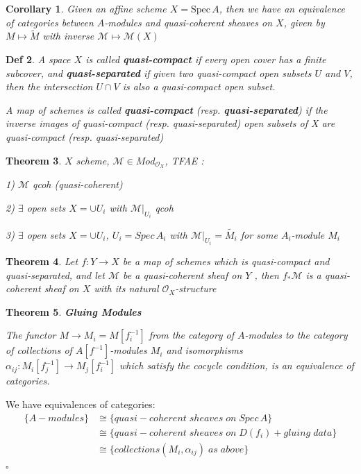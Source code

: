 \documentclass{article}
\newtheorem{theorem}{Theorem}[section]
\newtheorem{definition}[theorem]{Def}
\newtheorem{corollary}[theorem]{Corollary}
\newenvironment{Proof}{{\noindent \indent \it Proof:\quad}}{\hfill $\square$\par}
\begin{document}
\begin{corollary}
    Given an affine scheme $X =\mathrm{Spec}\, A$, then we have an equivalence of categories between $A$-modules and quasi-coherent sheaves on $X$, given by $M \mapsto \widetilde M$ with inverse $\mathcal M \mapsto \mathcal M(X)$
\end{corollary}

\begin{definition}
    A space $X$ is called \textbf{quasi-compact} if every open cover has a finite subcover, and
\textbf{quasi-separated} if given two quasi-compact open subsets $U$ and $V$, then the intersection $U \cap V$ is also
a quasi-compact open subset.

A map of schemes is called \textbf{quasi-compact} (resp. \textbf{quasi-separated}) if the
inverse images of quasi-compact (resp. quasi-separated) open subsets of X are quasi-compact (resp.
quasi-separated)
\end{definition}
\begin{theorem}
    $X$ scheme, $\mathcal M\in Mod_{\mathcal O_X}$, TFAE :
    
    1) $\mathcal M$ qcoh (quasi-coherent)

    2) $\exists$ open sets $X=\cup U_i$ with $\mathcal M|_{U_i}$ qcoh

    3) $\exists$ open sets $X=\cup U_i$, $U_i=Spec\, A_i$ with $\mathcal M|_{U_i}=\widetilde {M_i}$ for some $A_i$-module $M_i$
\label{Thm 3.58}
\end{theorem}

\begin{theorem}
    Let $f : Y \to X$ be a map of schemes which is quasi-compact and quasi-separated, and let $\mathcal M$ be a quasi-coherent sheaf on $Y$ , then $f_\ast\mathcal M$ is a quasi-coherent sheaf on $X$ with its natural $\mathcal O_X$-structure
    \label{Thm 3.59}
\end{theorem}

\begin{theorem}
    \textbf{Gluing Modules}

The functor $M \to M_i = M[f_i^{-1}]$ from the category of $A$-modules to the category of collections of $A[f^{-1}]$-modules $M_i$ and isomorphisms $\alpha_{ij} : M_i
[f_j^{-1}] \to M_j [f_i^{-1}]$ which
satisfy the cocycle condition, is an equivalence of categories.
\end{theorem}
\begin{Proof}
We have equivalences of categories:
\begin{align*}
\label{sup}
\{A-modules\}&\cong
\{quasi-coherent\; sheaves\; on\; Spec\, A\}\\
&\cong \{quasi-coherent\; sheaves\; on\; D(f_i) + gluing\; data\}\\
&\cong \{collections (M_i
, \alpha_{ij} )\; as\; above\}
 \end{align*}
\end{Proof}
 
\end{document}
